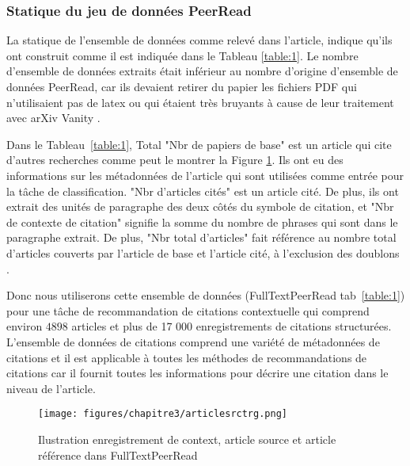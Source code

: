             \subsubsection{Statique du jeu de données PeerRead }
            \par La statique de l'ensemble de données comme relevé dans l'article, indique qu'ils ont construit comme il est indiquée dans le Tableau \ref{table:1}. Le nombre d'ensemble de données extraits était inférieur au nombre d'origine d'ensemble de données PeerRead, car ils devaient retirer du papier les fichiers PDF qui n'utilisaient pas de latex ou qui étaient très bruyants à cause de leur traitement avec arXiv Vanity \cite{arXiv}.
            
            \par Dans le Tableau~\ref{table:1}, Total "Nbr de papiers de base" est un article qui cite d'autres recherches comme peut le montrer la Figure \ref{fig:fig2ch3}. Ils ont eu des informations sur les métadonnées de l'article qui sont utilisées comme entrée pour la tâche de classification. "Nbr d'articles cités" est un article cité. De plus, ils ont extrait des unités de paragraphe des deux côtés du symbole de citation, et "Nbr de contexte de citation" signifie la somme du nombre de phrases qui sont dans le paragraphe extrait. De plus, "Nbr total d'articles" fait référence au nombre total d'articles couverts par l'article de base et l'article cité, à l'exclusion des doublons \cite{ch1ref8}.
            
            \par Donc nous utiliserons cette ensemble de données (FullTextPeerRead tab~\ref{table:1}) pour une tâche de recommandation de citations contextuelle qui comprend environ $4 898$ articles et plus de 17 000 enregistrements de citations structurées. L'ensemble de données de citations comprend une variété de métadonnées de citations et il est applicable à toutes les méthodes de recommandations de citations car il fournit toutes les informations pour décrire une citation dans le niveau de l'article.
    
            \begin{figure}[H]
            	\begin{center}
            		\texttt{[image: figures/chapitre3/articlesrctrg.png]}
            	\end{center}
            	\caption {Ilustration enregistrement de context, article source et article référence dans FullTextPeerRead}
            	\label{fig:fig2ch3}
            \end{figure} 
            
